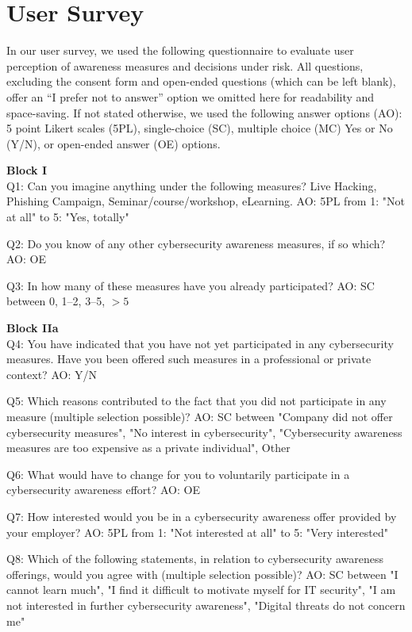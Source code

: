 \section{User Survey}
\label{app:survey}

In our user survey, we used the following questionnaire to evaluate
user perception of awareness measures and decisions under risk.
All questions, excluding the consent form and open-ended questions (which can be left blank), offer an “I prefer not to answer”
option we omitted here for readability and space-saving.
If not stated otherwise, we used the following answer options (AO): 5 point Likert scales (5PL), 
single-choice (SC), multiple choice (MC) Yes or No (Y/N),  or open-ended answer (OE) options.

\textbf{Block I}\\
Q1: Can you imagine anything under the following measures? Live Hacking, Phishing Campaign, Seminar/course/workshop, eLearning. AO: 5PL from 1: "Not at all" to 5: "Yes, totally"

Q2: Do you know of any other cybersecurity awareness measures, if so which? AO: OE

Q3: In how many of these measures have you already participated? AO: SC between 0, 1--2, 3--5, $>5$

\textbf{Block IIa}\\
Q4: You have indicated that you have not yet participated in any cybersecurity measures. Have you been offered such measures in a professional or private context? AO: Y/N

Q5: Which reasons contributed to the fact that you did not participate in any measure (multiple selection possible)? AO: SC between "Company did not offer cybersecurity measures", "No interest in cybersecurity", "Cybersecurity awareness measures are too expensive as a private individual", Other

Q6: What would have to change for you to voluntarily participate in a cybersecurity awareness effort? AO: OE

Q7: How interested would you be in a cybersecurity awareness offer provided by your employer? AO: 5PL from 1: "Not interested at all" to 5: "Very interested"

Q8: Which of the following statements, in relation to cybersecurity awareness offerings, would you agree with (multiple selection possible)? AO: SC between "I cannot learn much", "I find it difficult to motivate myself for IT security", "I am not interested in further cybersecurity awareness", "Digital threats do not concern me"

